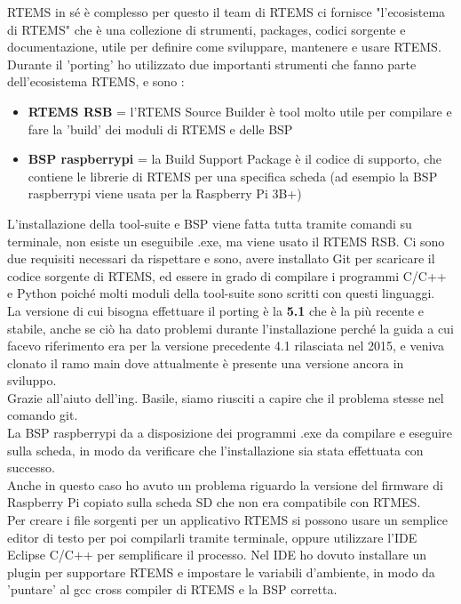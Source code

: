 \documentclass[12pt, a4paper, titlepage, oneside]{book}
\begin{document}
\begin{flushleft}
RTEMS in sé è complesso per questo il team di RTEMS ci fornisce "l'ecosistema di RTEMS" che è una collezione di strumenti, packages, codici sorgente e documentazione, utile per definire come sviluppare, mantenere e usare RTEMS.\\
Durante il 'porting' ho utilizzato due importanti strumenti che fanno parte dell'ecosistema RTEMS, e sono :
\begin{itemize}
    \item\textbf{ RTEMS RSB }= l'RTEMS Source Builder è tool molto utile per compilare e fare la 'build' dei moduli di RTEMS e delle BSP 
    \item\textbf{ BSP raspberrypi }= la Build Support Package è il codice di supporto, che contiene le librerie di RTEMS per una specifica scheda (ad esempio la BSP raspberrypi viene usata per la Raspberry Pi 3B+)
\end{itemize}
L'installazione della tool-suite e BSP viene fatta tutta tramite comandi su terminale, non esiste un eseguibile .exe, ma viene usato il RTEMS RSB. Ci sono due requisiti necessari da rispettare e sono, avere installato Git per scaricare il codice sorgente di RTEMS, ed essere in grado di compilare i programmi C/C++ e Python poiché molti moduli della tool-suite sono scritti con questi linguaggi.\\
La versione di cui bisogna effettuare il porting è la \textbf{5.1} che è la più recente e stabile, anche se ciò ha dato problemi durante l'installazione perché la guida a cui facevo riferimento era per la versione precedente 4.1 rilasciata nel 2015, e veniva clonato il ramo main dove attualmente è presente una versione ancora in sviluppo.\\
Grazie all'aiuto dell'ing. Basile, siamo riusciti a capire che il problema stesse nel comando git.\\
La BSP raspberrypi da a disposizione dei programmi .exe da compilare e eseguire sulla scheda, in modo da verificare che l'installazione sia stata effettuata con successo.\\
Anche in questo caso ho avuto un problema riguardo la versione del firmware di Raspberry Pi copiato sulla scheda SD che non era compatibile con RTMES.\\
Per creare i file sorgenti per un applicativo RTEMS si possono usare un semplice editor di testo per poi compilarli tramite terminale, oppure utilizzare l'IDE Eclipse C/C++ per semplificare il processo.
Nel IDE ho dovuto installare un plugin per supportare RTEMS e impostare le variabili d'ambiente, in modo da 'puntare' al gcc cross compiler di RTEMS e la BSP corretta.\\

\end{flushleft}
\end{document}
